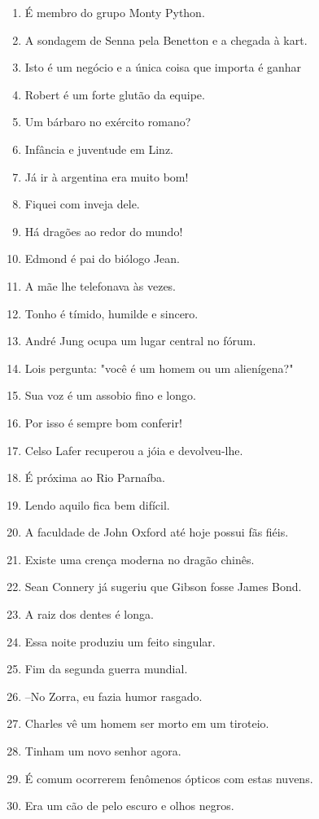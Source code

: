 \begin{enumerate}
\item \'E membro do grupo Monty Python.
\item A sondagem de Senna pela Benetton e a chegada \`a kart.
\item Isto \'e um neg\'ocio e a \'unica coisa que importa \'e ganhar
\item Robert \'e um forte glut\~ao da equipe.
\item Um b\'arbaro no ex\'ercito romano?
\item Inf\^ancia e juventude em Linz.
\item J\'a ir \`a argentina era muito bom!
\item Fiquei com inveja dele.
\item H\'a drag\~oes ao redor do mundo!
\item Edmond \'e pai do bi\'ologo Jean.
\item A m\~ae lhe telefonava \`as vezes.
\item Tonho \'e t\'imido, humilde e sincero.
\item Andr\'e Jung ocupa um lugar central no f\'orum.
\item Lois pergunta: "voc\^e \'e um homem ou um alien\'igena?"
\item Sua voz \'e um assobio fino e longo.
\item Por isso \'e sempre bom conferir!
\item Celso Lafer recuperou a j\'oia e devolveu-lhe.
\item \'E pr\'oxima ao Rio Parna\'iba.
\item Lendo aquilo fica bem dif\'icil.
\item A faculdade de John Oxford at\'e hoje possui f\~as fi\'eis.
\item Existe uma cren\c{c}a moderna no drag\~ao chin\^es.
\item Sean Connery j\'a sugeriu que Gibson fosse James Bond.
\item A raiz dos dentes \'e longa.
\item Essa noite produziu um feito singular.
\item Fim da segunda guerra mundial.
\item --No Zorra, eu fazia humor rasgado.
\item Charles v\^e um homem ser morto em um tiroteio.
\item Tinham um novo senhor agora.
\item \'E comum ocorrerem fen\^omenos \'opticos com estas nuvens.
\item Era um c\~ao de pelo escuro e olhos negros.

\end{enumerate}
